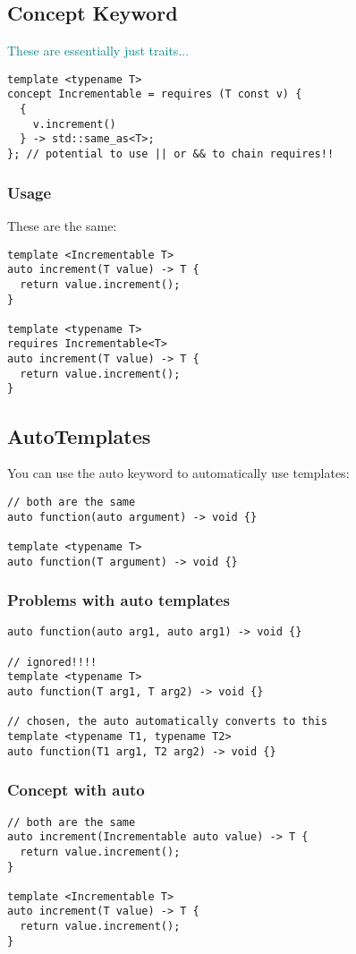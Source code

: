 \documentclass[main.tex,fontsize=8pt,paper=a4,paper=portrait,DIV=calc,]{scrartcl}
\begin{document}
\subsection{Concept Keyword}
\textcolor{teal}{These are essentially just traits...}
\begin{lstlisting}
template <typename T>
concept Incrementable = requires (T const v) { 
  {
    v.increment()
  } -> std::same_as<T>;
}; // potential to use || or && to chain requires!!
\end{lstlisting}

\subsubsection{Usage}
These are the same:
\begin{lstlisting}
template <Incrementable T>
auto increment(T value) -> T {
  return value.increment();
}

template <typename T>
requires Incrementable<T>
auto increment(T value) -> T {
  return value.increment();
}
\end{lstlisting}

\subsection{AutoTemplates}
You can use the auto keyword to automatically use templates:
\begin{lstlisting}
// both are the same
auto function(auto argument) -> void {}

template <typename T>
auto function(T argument) -> void {}
\end{lstlisting}

\subsubsection{Problems with auto templates}
\begin{lstlisting}
auto function(auto arg1, auto arg1) -> void {}

// ignored!!!!
template <typename T>
auto function(T arg1, T arg2) -> void {}

// chosen, the auto automatically converts to this
template <typename T1, typename T2>
auto function(T1 arg1, T2 arg2) -> void {}
\end{lstlisting}

\subsubsection{Concept with auto}
\begin{lstlisting}
// both are the same
auto increment(Incrementable auto value) -> T {
  return value.increment();
}

template <Incrementable T>
auto increment(T value) -> T {
  return value.increment();
}
\end{lstlisting}
\end{document}
